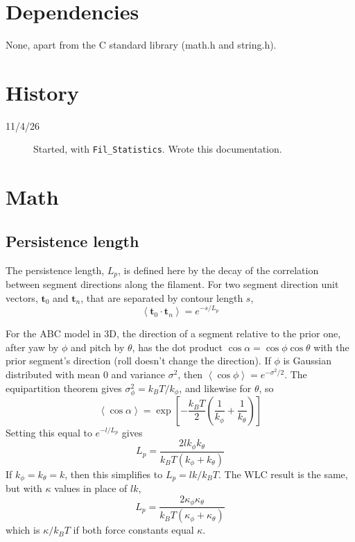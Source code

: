 \documentclass[11pt]{article}
\newcommand {\ttt} {\texttt}
\begin{document}
\section{Dependencies}
None, apart from the C standard library (math.h and string.h).

\section{History}
\begin{description}

\item[11/4/26] Started, with \ttt{Fil\_Statistics}. Wrote this documentation.

\end{description}


\section{Math}

\subsection{Persistence length}

The persistence length, $L_p$, is defined here by the decay of the correlation between segment directions along the filament. For two segment direction unit vectors, $\bm{t}_0$ and $\bm{t}_n$, that are separated by contour length $s$,
\begin{equation}
\left< \bm{t}_0 \cdot \bm{t}_n \right> = e^{-s/L_p}
\end{equation}

For the ABC model in 3D, the direction of a segment relative to the prior one, after yaw by $\phi$ and pitch by $\theta$, has the dot product $\cos \alpha = \cos \phi \cos \theta$ with the prior segment's direction (roll doesn't change the direction). If $\phi$ is Gaussian distributed with mean 0 and variance $\sigma^2$, then $\left<\cos \phi \right> = e^{-\sigma^2/2}$. The equipartition theorem gives $\sigma_\phi^2=k_BT/k_\phi$, and likewise for $\theta$, so
\begin{equation}
\left< \cos \alpha \right> = \exp\left[ -\frac{k_BT}{2} \left( \frac{1}{k_\phi} + \frac{1}{k_\theta} \right) \right]
\end{equation}
Setting this equal to $e^{-l/L_p}$ gives
\begin{equation}
L_p = \frac{2 l k_\phi k_\theta}{k_BT(k_\phi + k_\theta)}
\label{eq:PersistABC}
\end{equation}
If $k_\phi = k_\theta = k$, then this simplifies to $L_p = l k/k_BT$. The WLC result is the same, but with $\kappa$ values in place of $l k$,
\begin{equation}
L_p = \frac{2 \kappa_\phi \kappa_\theta}{k_BT(\kappa_\phi + \kappa_\theta)}
\end{equation}
which is $\kappa/k_BT$ if both force constants equal $\kappa$.
\end{document}
